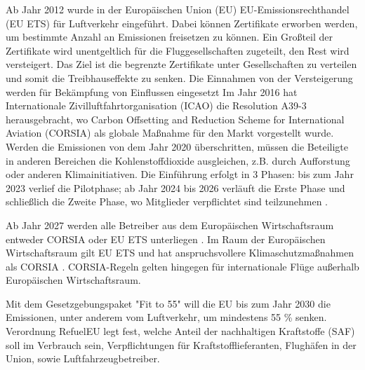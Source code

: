 Ab Jahr 2012 wurde in der Europäischen Union (EU) EU-Emissionsrechthandel (EU ETS) für Luftverkehr eingeführt.
Dabei können Zertifikate erworben werden, um bestimmte Anzahl an Emissionen freisetzen zu können.
Ein Großteil der Zertifikate wird unentgeltlich für die Fluggesellschaften zugeteilt, den Rest wird versteigert. 
Das Ziel ist die begrenzte Zertifikate unter Gesellschaften zu verteilen und somit die Treibhauseffekte zu senken.
Die Einnahmen von der Versteigerung werden für Bekämpfung von Einflussen eingesetzt \cite{conrady2019luftverkehr}
Im Jahr 2016 hat Internationale Zivilluftfahrtorganisation (ICAO) die Resolution A39-3 herausgebracht, 
wo Carbon Offsetting and Reduction Scheme for International Aviation (CORSIA) als globale Maßnahme für den Markt vorgestellt wurde. 
Werden die Emissionen von dem Jahr 2020 überschritten, müssen die Beteiligte in anderen Bereichen die Kohlenstoffdioxide ausgleichen, z.B.
durch Aufforstung oder anderen Klimainitiativen. 
Die Einführung erfolgt in 3 Phasen: 
bis zum Jahr 2023 verlief die Pilotphase; ab Jahr 2024 bis 2026 verläuft die Erste Phase und schließlich die Zweite Phase, wo Mitglieder verpflichtet sind 
teilzunehmen \cite{conrady2019luftverkehr}. 


Ab Jahr 2027 werden alle Betreiber aus dem Europäischen Wirtschaftsraum entweder CORSIA oder EU ETS unterliegen \cite{uba_aviation_2023}.
Im Raum der Europäischen Wirtschaftsraum gilt EU ETS und hat anspruchsvollere Klimaschutzmaßnahmen als CORSIA \cite{uba_aviation_2023}.
CORSIA-Regeln gelten hingegen für internationale Flüge außerhalb Europäischen Wirtschaftsraum.

Mit dem Gesetzgebungspaket "Fit to 55" will die EU bis zum Jahr 2030 die Emissionen, unter anderem vom Luftverkehr, um mindestens 55 \% senken.
Verordnung RefuelEU legt fest, welche Anteil der nachhaltigen Kraftstoffe (SAF) soll im Verbrauch sein, Verpflichtungen für 
Kraftstofflieferanten, Flughäfen in der Union, sowie Luftfahrzeugbetreiber.
